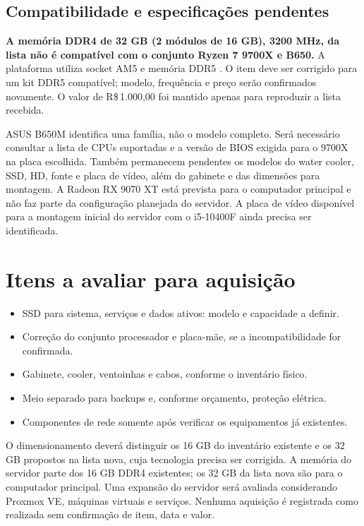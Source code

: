 \documentclass[11pt,a4paper,oneside]{report}
\newcommand{\dinheiro}[1]{R\$\,#1}
\begin{document}
\subsection{Compatibilidade e especificações pendentes}
\textbf{A memória DDR4 de 32 GB (2 módulos de 16 GB), 3200 MHz, da lista não é
compatível com o conjunto Ryzen 7 9700X e B650.} A plataforma utiliza socket
AM5 e memória DDR5 \cite{ryzen9700,asusb650}. O item deve ser corrigido para
um kit DDR5 compatível; modelo, frequência e preço serão confirmados novamente.
O valor de \dinheiro{1.000,00} foi mantido apenas para reproduzir a lista recebida.

ASUS B650M identifica uma família, não o modelo completo. Será necessário
consultar a lista de CPUs suportadas e a versão de BIOS exigida para o 9700X
na placa escolhida. Também permanecem pendentes os modelos do water cooler,
SSD, HD, fonte e placa de vídeo, além do gabinete e das dimensões para montagem.
A Radeon RX 9070 XT está prevista para o computador principal e não faz parte
da configuração planejada do servidor. A placa de vídeo disponível para a
montagem inicial do servidor com o i5-10400F ainda precisa ser identificada.

\section{Itens a avaliar para aquisição}
\begin{itemize}
\item SSD para sistema, serviços e dados ativos: modelo e capacidade a definir.
\item Correção do conjunto processador e placa-mãe, se a incompatibilidade for confirmada.
\item Gabinete, cooler, ventoinhas e cabos, conforme o inventário físico.
\item Meio separado para backups e, conforme orçamento, proteção elétrica.
\item Componentes de rede somente após verificar os equipamentos já existentes.
\end{itemize}
O dimensionamento deverá distinguir os 16 GB do inventário existente e os
32 GB propostos na lista nova, cuja tecnologia precisa ser corrigida. A memória
do servidor parte dos 16 GB DDR4 existentes; os 32 GB da lista nova são para o
computador principal. Uma expansão do servidor será avaliada considerando
Proxmox VE, máquinas virtuais e serviços. Nenhuma aquisição é registrada
como realizada sem confirmação de item, data e valor.
\end{document}
